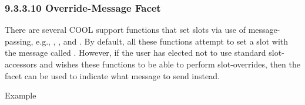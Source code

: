 \documentclass[letterpaper,10pt,english]{sphinxmanual}
\begin{document}
\begin{sphinxVerbatim}[commandchars=\\\{\}]
 
   
     
     
      
\PYG{p}{[}\PYG{p}{]}
      
\PYG{p}{[}\PYG{p}{]}       
\end{sphinxVerbatim}


\subsubsection{9.3.3.10 Override-Message Facet}
\label{\detokenize{cool:override-message-facet}}
There are several COOL support functions that set slots via use of
message-passing, e.g., , ,
 and . By
default, all these functions attempt to set a slot with the message
called . However, if the user has elected not to use
standard slot-accessors and wishes these functions to be able to perform
slot-overrides, then the  facet can be used to
indicate what message to send instead.

Example
\end{document}
